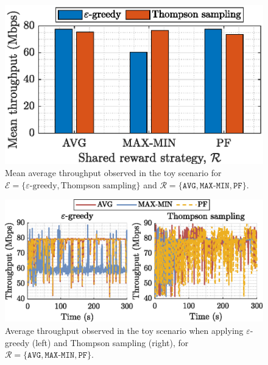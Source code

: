 \begin{figure}[ht!]
\centering
\includegraphics[width=.75\columnwidth]{figures/comparison_of_policies.eps}
\caption{Mean average throughput observed in the toy scenario for $\mathcal{E} = \{\varepsilon\text{-greedy}, \text{Thompson sampling}\}$ and $\mathcal{R} = \{\texttt{AVG}, \texttt{MAX-MIN}, \texttt{PF}\}$.}
\label{fig:comparison_of_policies}
\end{figure}

\begin{figure}[ht!]
\centering
\includegraphics[width=\columnwidth]{figures/comparison_of_policies_temporary_throughput.eps}
\caption{Average throughput observed in the toy scenario when applying $\varepsilon$-greedy (left) and Thompson sampling (right), for $\mathcal{R} = \{\texttt{AVG}, \texttt{MAX-MIN}, \texttt{PF}\}$.}
\label{fig:comparison_of_policies_temporary_throughput}
\end{figure}

